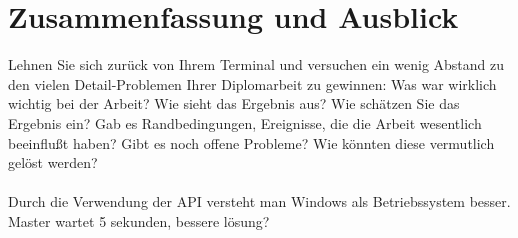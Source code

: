\chapter{Zusammenfassung und Ausblick}\label{chp:zusammenfassung}
Lehnen Sie sich zurück von Ihrem Terminal und versuchen ein wenig Abstand zu den vielen Detail-Problemen Ihrer Diplomarbeit zu gewinnen:
Was war wirklich wichtig bei der Arbeit? 
Wie sieht das Ergebnis aus?
Wie schätzen Sie das Ergebnis ein?
Gab es Randbedingungen, Ereignisse, die die Arbeit wesentlich beeinflußt haben?
Gibt es noch offene Probleme?
Wie könnten diese vermutlich gelöst werden?\\\\




 Durch die Verwendung der API versteht man Windows als Betriebssystem besser.\\
 
 Master wartet 5 sekunden, bessere lösung?\\
 
 